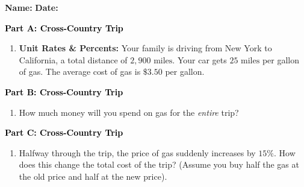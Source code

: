 \documentclass[12pt, letterpaper, fleqn]{article}
\begin{document}
\textbf{Name:} \underline{\hspace{5cm}}
\hfill
\textbf{Date:} \underline{\hspace{3cm}}\\

\begin{tcolorbox}[colback=customteal!20]
\large\textcolor{black}{\textbf{Part A: Cross-Country Trip}}
\end{tcolorbox}

\vspace{3mm}

\begin{enumerate}[itemsep=4.2cm, leftmargin=0.6cm]
\item \textbf{Unit Rates \& Percents:} Your family is driving from New York to California, a total distance of $2,900\text{ miles}$. Your car gets $25\text{ miles}$ per gallon of gas. The average cost of gas is $\$3.50$ per gallon. 
\end{enumerate}

\newpage

\begin{tcolorbox}[colback=customteal!20]
\large\textcolor{black}{\textbf{Part B: Cross-Country Trip}}
\end{tcolorbox}

\vspace{3mm}

\begin{enumerate}[itemsep=4.2cm, leftmargin=0.6cm, resume]
\item How much money will you spend on gas for the \textit{entire} trip?
\end{enumerate}

\newpage

\begin{tcolorbox}[colback=customteal!20]
\large\textcolor{black}{\textbf{Part C: Cross-Country Trip}}
\end{tcolorbox}

\vspace{3mm}

\begin{enumerate}[itemsep=4.2cm, leftmargin=0.6cm, resume]
\item Halfway through the trip, the price of gas suddenly increases by $15\%$. How does this change the total cost of the trip? (Assume you buy half the gas at the old price and half at the new price).
\end{enumerate}
\end{document}

